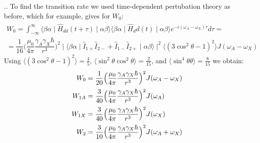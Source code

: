 \documentclass[handout]{beamer}
\begin{document}
\begin{frame}[shrink=5]{\thesection.\thesubsection. \insertsubsection}
 To find the transition rate we used time-dependent pertubation theory as before, which for example, gives for $W_0$:
 \begin{multline}
   W_0 = \int_{-\infty}^{\infty} \overline{ \langle \beta \alpha \mid \hat{H}_{dd}(t + \tau) \mid \alpha \beta  \rangle \langle \beta \alpha \mid  \hat{H}_dd(t)  \mid \alpha \beta \rangle} e^{-i(\omega_A - \omega_X)\tau} d\tau = \\
   = \dfrac{1}{16} \Big( \dfrac{\mu_0}{4 \pi} \dfrac{\gamma_A \gamma_X \hbar}{r^3}  \Big)^2 \mid  \langle  \beta \alpha  \mid  \hat{I}_{1+} \hat{I}_{2-} + \hat{I}_{1-} \hat{I}_{2+} \mid  \alpha \beta \rangle \mid^2  \langle (3 \cos^2 \theta - 1) ^2 \rangle  J(\omega_A - \omega_X)
 \end{multline} 
 Using $ \langle (3 \cos^2 \theta - 1) ^2 \rangle = \frac{4}{5}$, $\langle \sin^2 \theta \cos^2 \theta \rangle = \frac{2}{15}$,  and $\langle \sin^4 \theta  \theta \rangle = \frac{8}{15}$ we obtain:
   \begin{equation}
    	 \setlength{\jot}{5pt}
   \begin{aligned}
         W_0 &= \dfrac{1}{20} \Big(  \dfrac{\mu_0}{4 \pi} \dfrac{\gamma_A \gamma_X \hbar}{r^3} \Big)^2 J(\omega_A - \omega_X) \\
         W_{1A} &=\dfrac{3}{40} \Big(  \dfrac{\mu_0}{4 \pi} \dfrac{\gamma_A \gamma_X \hbar}{r^3} \Big)^2 J(\omega_A) \\
         W_{1X} &= \dfrac{3}{40} \Big(  \dfrac{\mu_0}{4 \pi} \dfrac{\gamma_A \gamma_X \hbar}{r^3} \Big)^2 J(\omega_X) \\
         W_{2}&=\dfrac{3}{10} \Big(  \dfrac{\mu_0}{4 \pi} \dfrac{\gamma_A \gamma_X \hbar}{r^3} \Big)^2 J(\omega_A + \omega_X)          
   \end{aligned}
   \end{equation}
\end{frame}
\end{document}

